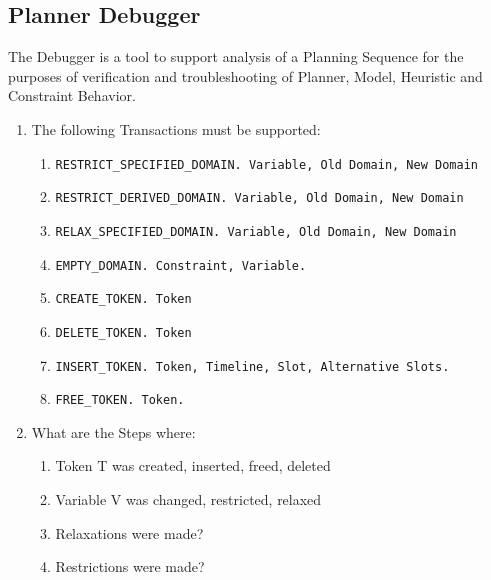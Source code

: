 \documentclass[twoside, 11pt]{article}
\begin{document}
\subsection{Planner Debugger}
The Debugger is a tool to support analysis of a Planning Sequence for the purposes of verification and troubleshooting of Planner, Model, Heuristic and Constraint Behavior.
\begin{enumerate}
\item The following Transactions must be supported:
\begin{enumerate}
\item \begin{verbatim}RESTRICT_SPECIFIED_DOMAIN. Variable, Old Domain, New Domain\end{verbatim}
\item \begin{verbatim}RESTRICT_DERIVED_DOMAIN. Variable, Old Domain, New Domain\end{verbatim}
\item \begin{verbatim}RELAX_SPECIFIED_DOMAIN. Variable, Old Domain, New Domain\end{verbatim}
\item \begin{verbatim}EMPTY_DOMAIN. Constraint, Variable.\end{verbatim}
\item \begin{verbatim}CREATE_TOKEN. Token\end{verbatim}
\item \begin{verbatim}DELETE_TOKEN. Token\end{verbatim}
\item \begin{verbatim}INSERT_TOKEN. Token, Timeline, Slot, Alternative Slots.\end{verbatim}
\item \begin{verbatim}FREE_TOKEN. Token.\end{verbatim}
\end{enumerate}
\item What are the Steps where:
\begin{enumerate}
\item Token T was created, inserted, freed, deleted
\item Variable V was changed, restricted, relaxed
\item Relaxations were made?
\item Restrictions were made?

\end{enumerate}
\end{enumerate}
\end{document}
